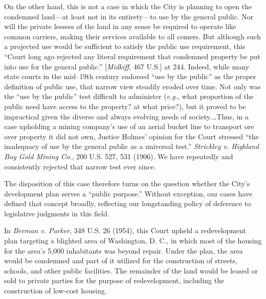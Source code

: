 On the other hand, this is not a case in which the City is planning to open the
condemned land---at least not in its entirety---to use by the general public.
Nor will the private lessees of the land in any sense be required to operate
like common carriers, making their services available to all comers. But
although such a projected use would be sufficient to satisfy the public use
requirement, this ``Court long ago rejected any literal requirement that
condemned property be put into use for the general public.'' [\textit{Midkiff},
467 U.S.] at 244. Indeed, while many state courts in the mid--19th century
endorsed ``use by the public'' as the proper definition of public use, that
narrow view steadily eroded over time. Not only was the ``use by the public''
test difficult to administer (\textit{e.g.}, what proportion of the public need
have access to the property? at what price?), but it proved to be impractical
given the diverse and always evolving needs of society.\ldots Thus, in a case
upholding a mining company's use of an aerial bucket line to transport ore over
property it did not own, Justice Holmes' opinion for the Court stressed ``the
inadequacy of use by the general public as a universal test.'' \textit{Strickley
v. Highland Boy Gold Mining Co.}, 200 U.S. 527, 531 (1906). We have repeatedly
and consistently rejected that narrow test ever since.

The disposition of this case therefore turns on the question whether the City's
development plan serves a ``public purpose.'' Without exception, our cases have
defined that concept broadly, reflecting our longstanding policy of deference to
legislative judgments in this field.

In \textit{Berman v. Parker}, 348 U.S. 26 (1954), this Court upheld a
redevelopment plan targeting a blighted area of Washington, D. C., in which most
of the housing for the area's 5,000 inhabitants was beyond repair. Under the
plan, the area would be condemned and part of it utilized for the construction
of streets, schools, and other public facilities. The remainder of the land
would be leased or sold to private parties for the purpose of redevelopment,
including the construction of low-cost housing.


